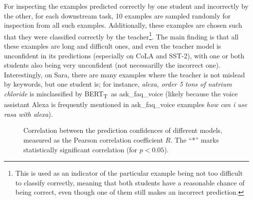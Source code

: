 \documentclass[bsc,frontabs,singlespacing,parskip,deptreport]{infthesis}
\def\BERTT{BERT\textsubscript{T}}
\begin{document}
{{{      For inspecting the examples predicted correctly by one student and incorrectly by the other, for each downstream task, 10 examples are sampled randomly for inspection from all such examples.
      Additionally, these examples are chosen such that they were classified correctly by the teacher\footnote{This is used as an indicator of the particular example being not too difficult to classify correctly, meaning that both students have a reasonable chance of being correct, even though one of them still makes an incorrect prediction.}.
      The main finding is that all these examples are long and difficult ones, and even the teacher model is unconfident in its predictions (especially on CoLA and SST-2), with one or both students also being very unconfident (not necessarilly the incorrect one). Interestingly, on Sara, there are many examples where the teacher is not mislead by keywords, but one student is; for instance, \textit{alexa, order 5 tons of natrium chloride} is misclassified by \BERTT~as ask\_faq\_voice (likely because the voice assistant Alexa is frequently mentioned in ask\_faq\_voice examples \textit{how can i use rasa with alexa}).
      
      \begin{figure}[h!tb]
        \centering
        \caption{Correlation between the prediction confidences of different models, measured as the Pearson correlation coefficient $R$. The ``*'' marks statistically significant correlation (for $p < 0.05$).}
        \label{fig:confidence-correlation}
      \end{figure}

}}}
\end{document}
